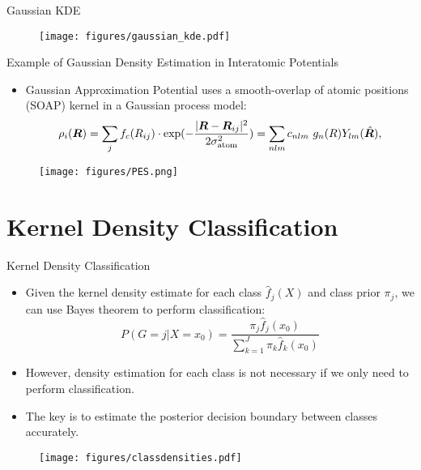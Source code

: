 \documentclass[aspectratio=169]{beamer}
\begin{document}
\begin{frame}{Gaussian KDE}
\begin{figure}
    \centering
    \texttt{[image: figures/gaussian\_kde.pdf]}
\end{figure}
\end{frame}


 \begin{frame}{Example of Gaussian Density Estimation in Interatomic Potentials}
    \begin{itemize}
        \item Gaussian Approximation Potential\cite{bartokGaussianApproximationPotentials2010} uses a smooth-overlap of atomic positions (SOAP) kernel in a Gaussian process model:
    \begin{eqnarray*}
        \rho_{i}(\boldsymbol{R}) = \sum_{j} f_{c}(R_{ij}) \cdot \exp(-\frac{|\boldsymbol{R} - \boldsymbol{R}_{ij}|^{2}}{2\sigma_{\rm atom}^{2}}) = \sum_{nlm} c_{nlm} \ g_{n}(R) Y_{lm}(\hat{\boldsymbol{R}}),
    \end{eqnarray*}
    \end{itemize}
    \begin{figure}
        \centering
        \texttt{[image: figures/PES.png]}
    \end{figure}
\end{frame}


\section{Kernel Density Classification}

\begin{frame}{Kernel Density Classification}
    \begin{itemize}
        \item Given the kernel density estimate for each class $\hat{f}_j(X)$ and class prior $\pi_j$, we can use Bayes theorem to perform classification:
        \begin{equation*}
            P(G=j|X=x_0) = \frac{\pi_j \hat{f}_j(x_0)}{\sum_{k=1}^J\pi_k \hat{f}_k(x_0)}
        \end{equation*}
        \item However, density estimation for each class is not necessary if we only need to perform classification.
        \item The key is to estimate the posterior decision boundary between classes accurately.
    \end{itemize}
    \begin{figure}
        \centering
        \texttt{[image: figures/classdensities.pdf]}
    \end{figure}
\end{frame}
\end{document}
